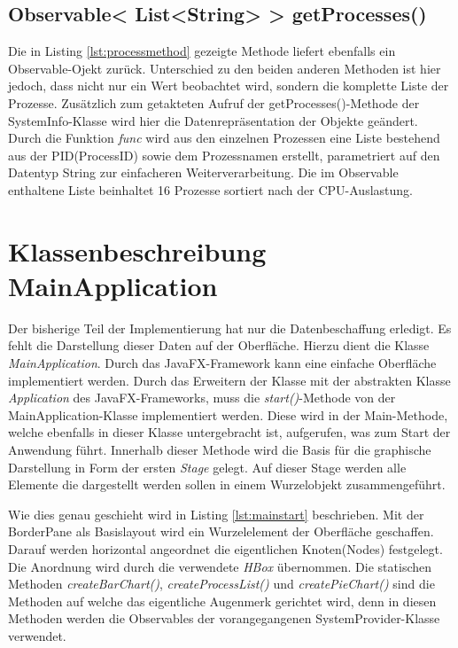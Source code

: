 \subsection{Observable< List<String> > getProcesses()}

Die in Listing \ref{lst:processmethod} gezeigte Methode liefert ebenfalls ein Observable-Ojekt zurück. Unterschied zu den beiden anderen Methoden ist hier jedoch, dass nicht nur ein Wert beobachtet wird, sondern die komplette Liste der Prozesse. Zusätzlich zum getakteten Aufruf der getProcesses()-Methode der SystemInfo-Klasse wird hier die Datenrepräsentation der Objekte geändert. Durch die Funktion \textit{func} wird aus den einzelnen Prozessen eine Liste bestehend aus der PID(ProcessID) sowie dem Prozessnamen erstellt, parametriert auf den Datentyp String zur einfacheren Weiterverarbeitung. Die im Observable enthaltene Liste beinhaltet 16 Prozesse sortiert nach der CPU-Auslastung. \newpage
\section{Klassenbeschreibung MainApplication}
Der bisherige Teil der Implementierung hat nur die Datenbeschaffung erledigt. Es fehlt die Darstellung dieser Daten auf der Oberfläche. Hierzu dient die Klasse \textit{MainApplication}. Durch das JavaFX-Framework kann eine einfache Oberfläche implementiert werden. Durch das Erweitern der Klasse mit der abstrakten Klasse \textit{Application} des JavaFX-Frameworks, muss die \textit{start()}-Methode von der MainApplication-Klasse implementiert werden. Diese wird in der Main-Methode, welche ebenfalls in dieser Klasse untergebracht ist, aufgerufen, was zum Start der Anwendung führt. Innerhalb dieser Methode wird die Basis für die graphische Darstellung in Form der ersten \textit{Stage} gelegt. Auf dieser Stage werden alle Elemente die dargestellt werden sollen in einem Wurzelobjekt zusammengeführt. 
 
Wie dies genau geschieht wird in Listing \ref{lst:mainstart} beschrieben. Mit der BorderPane als Basislayout wird ein Wurzelelement der Oberfläche geschaffen. Darauf werden horizontal angeordnet die eigentlichen Knoten(Nodes) festgelegt. Die Anordnung wird durch die verwendete \textit{HBox} übernommen. Die statischen Methoden \textit{createBarChart()}, \textit{createProcessList()} und \textit{createPieChart()} sind die Methoden auf welche das eigentliche Augenmerk gerichtet wird, denn in diesen Methoden werden die Observables der vorangegangenen SystemProvider-Klasse verwendet. 
